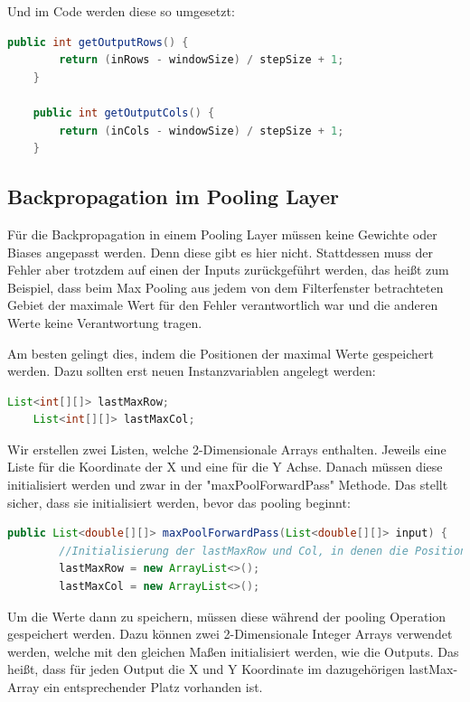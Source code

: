 \documentclass[12pt]{article}
\begin{document}
Und im Code werden diese so umgesetzt:

\begin{lstlisting}[language=Java]
    public int getOutputRows() {
        return (inRows - windowSize) / stepSize + 1;
    }

    public int getOutputCols() {
        return (inCols - windowSize) / stepSize + 1;
    }
\end{lstlisting}

\subsection{Backpropagation im Pooling Layer}
Für die Backpropagation in einem Pooling Layer müssen keine Gewichte oder Biases angepasst werden. Denn diese gibt es hier nicht. Stattdessen muss der Fehler aber trotzdem auf einen der Inputs zurückgeführt werden, das heißt zum Beispiel, dass beim Max Pooling aus jedem von dem Filterfenster betrachteten Gebiet der maximale Wert für den Fehler verantwortlich war und die anderen Werte keine Verantwortung tragen. 


Am besten gelingt dies, indem die Positionen der maximal Werte gespeichert werden.
Dazu sollten erst neuen Instanzvariablen angelegt werden:


\begin{lstlisting}[language=Java]
    List<int[][]> lastMaxRow;
    List<int[][]> lastMaxCol; 
\end{lstlisting}

Wir erstellen zwei Listen, welche 2-Dimensionale Arrays enthalten. Jeweils eine Liste für die Koordinate der X und eine für die Y Achse.
Danach müssen diese initialisiert werden und zwar in der "maxPoolForwardPass" Methode. Das stellt sicher, dass sie initialisiert werden, bevor das pooling beginnt:

\begin{lstlisting}[language=Java]
    public List<double[][]> maxPoolForwardPass(List<double[][]> input) {
        //Initialisierung der lastMaxRow und Col, in denen die Position der Maximalen Werte gespeichert werden
        lastMaxRow = new ArrayList<>();
        lastMaxCol = new ArrayList<>();
\end{lstlisting}

Um die Werte dann zu speichern, müssen diese während der pooling Operation gespeichert werden.
Dazu können zwei 2-Dimensionale Integer Arrays verwendet werden, welche mit den gleichen Maßen initialisiert werden, wie die Outputs. Das heißt, dass für jeden Output die X und Y Koordinate im dazugehörigen lastMax-Array ein entsprechender Platz vorhanden ist.
\end{document}
